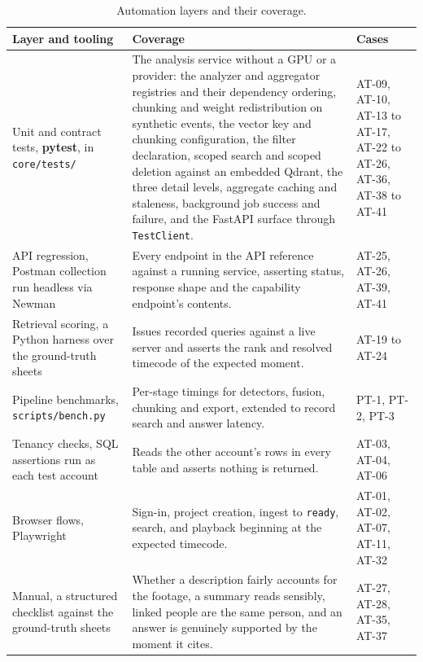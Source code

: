 \documentclass[11pt,a4paper]{article}
\begin{document}
\begin{table}[htbp]
\centering
\footnotesize
\begin{tabularx}{\textwidth}{@{}L{2.9cm}XL{2.0cm}@{}}
\toprule
\textbf{Layer and tooling} & \textbf{Coverage} & \textbf{Cases} \\
\midrule
Unit and contract tests, \textbf{pytest}, in \texttt{core/tests/} &
The analysis service without a GPU or a provider: the analyzer and aggregator
registries and their dependency ordering, chunking and weight redistribution on
synthetic events, the vector key and chunking configuration, the filter
declaration, scoped search and scoped deletion against an embedded Qdrant, the
three detail levels, aggregate caching and staleness, background job success and
failure, and the FastAPI surface through \texttt{TestClient}. &
AT-09, AT-10, AT-13 to AT-17, AT-22 to AT-26, AT-36, AT-38 to AT-41 \\
API regression, Postman collection run headless via Newman &
Every endpoint in the API reference against a running service, asserting status,
response shape and the capability endpoint's contents. & AT-25, AT-26, AT-39,
AT-41 \\
Retrieval scoring, a Python harness over the ground-truth sheets &
Issues recorded queries against a live server and asserts the rank and resolved
timecode of the expected moment. & AT-19 to AT-24 \\
Pipeline benchmarks, \texttt{scripts/bench.py} &
Per-stage timings for detectors, fusion, chunking and export, extended to record
search and answer latency. & PT-1, PT-2, PT-3 \\
Tenancy checks, SQL assertions run as each test account &
Reads the other account's rows in every table and asserts nothing is returned. &
AT-03, AT-04, AT-06 \\
Browser flows, Playwright &
Sign-in, project creation, ingest to \texttt{ready}, search, and playback
beginning at the expected timecode. & AT-01, AT-02, AT-07, AT-11, AT-32 \\
\addlinespace[2pt]
Manual, a structured checklist against the ground-truth sheets &
Whether a description fairly accounts for the footage, a summary reads sensibly,
linked people are the same person, and an answer is genuinely supported by the
moment it cites. & AT-27, AT-28, AT-35, AT-37 \\
\bottomrule
\end{tabularx}
\caption{Automation layers and their coverage.}
\end{table}
\end{document}
